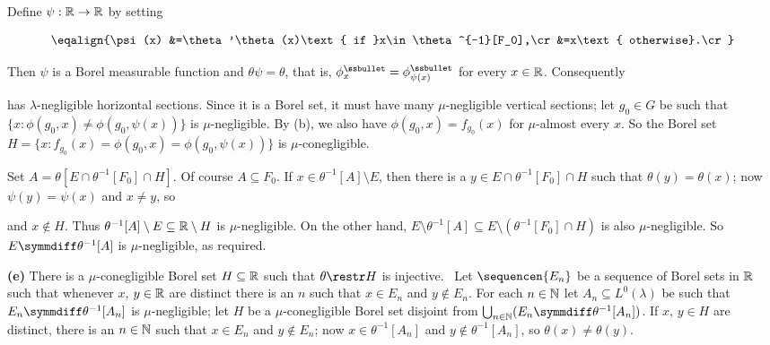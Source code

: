 {

Define $\psi:\Bbb R\to\Bbb R$ by setting

$$\eqalign{\psi(x)
&=\theta'\theta(x)\text{ if }x\in\theta^{-1}[F_0],\cr
&=x\text{ otherwise}.\cr}$$

\noindent Then $\psi$ is a Borel measurable
function and $\theta\psi=\theta$, that is,
$\phi_x^{\ssbullet}=\phi_{\psi(x)}^{\ssbullet}$ for every $x\in\Bbb R$.
Consequently


\noindent has $\lambda$-negligible horizontal sections.
Since it is a Borel set, it must have many $\mu$-negligible vertical
sections;  let $g_0\in G$ be such that
$\{x:\phi(g_0,x)\ne\phi(g_0,\psi(x))\}$ is $\mu$-negligible.
By (b), we also have $\phi(g_0,x)=f_{g_0}(x)$ for $\mu$-almost every $x$.
So the Borel set
$H=\{x:f_{g_0}(x)=\phi(g_0,x)=\phi(g_0,\psi(x))\}$
is $\mu$-conegligible.

Set $A=\theta[E\cap\theta^{-1}[F_0]\cap H]$.
Of course $A\subseteq F_0$.   If $x\in\theta^{-1}[A]\setminus E$,
then there is a
$y\in E\cap\theta^{-1}[F_0]\cap H$ such that $\theta(y)=\theta(x)$;  now
$\psi(y)=\psi(x)$ and $x\ne y$, so


\noindent and $x\notin H$.   Thus
$\theta^{-1}[A]\setminus E\subseteq\Bbb R\setminus H$ is $\mu$-negligible.
On the other hand,
$E\setminus\theta^{-1}[A]\subseteq E\setminus(\theta^{-1}[F_0]\cap H)$
is also $\mu$-negligible.   So
$E\symmdiff\theta^{-1}[A]$ is $\mu$-negligible, as required.\ \Qed

\medskip

{\bf (e)} There is a $\mu$-conegligible Borel set
$H\subseteq\Bbb R$ such that
$\theta\restr H$ is injective.   \Prf\ Let $\sequencen{E_n}$ be a sequence
of Borel sets in $\Bbb R$ such that whenever $x$, $y\in\Bbb R$ are
distinct there is an $n$ such that $x\in E_n$ and $y\notin E_n$.
For each $n\in\Bbb N$
let $A_n\subseteq L^0(\lambda)$ be such that
$E_n\symmdiff\theta^{-1}[A_n]$ is
$\mu$-negligible;  let $H$ be a $\mu$-conegligible Borel set disjoint from
$\bigcup_{n\in\Bbb N}(E_n\symmdiff\theta^{-1}[A_n])$.   If $x$, $y\in H$
are distinct, there is an $n\in\Bbb N$ such that $x\in E_n$ and
$y\notin E_n$;  now $x\in\theta^{-1}[A_n]$ and $y\notin\theta^{-1}[A_n]$,
so $\theta(x)\ne\theta(y)$.\ \Qed

}
